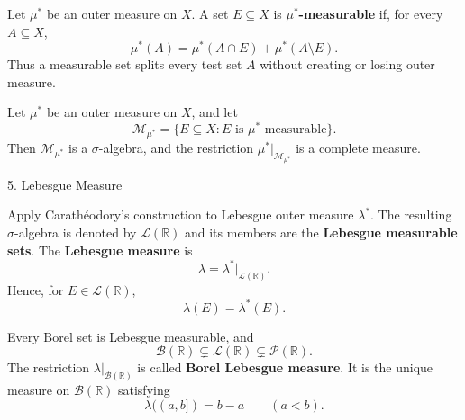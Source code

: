 \documentclass[12pt,a4paper]{article}
\begin{document}
\vspace{10pt}

\begin{definition}
    Let $\mu^*$ be an outer measure on $X$. A set $E\subseteq X$ is \textbf{$\mu^*$-measurable} if, for every $A\subseteq X$,
    \[
        \mu^*(A)=\mu^*(A\cap E)+\mu^*(A\setminus E).
    \]
    Thus a measurable set splits every test set $A$ without creating or losing outer measure.
\end{definition}

\clearpage

\begin{theorem}
    Let $\mu^*$ be an outer measure on $X$, and let
    \[
        \mathcal{M}_{\mu^*}
        =\{E\subseteq X:E\text{ is $\mu^*$-measurable}\}.
    \]
    Then $\mathcal{M}_{\mu^*}$ is a $\sigma$-algebra, and the restriction
    $\mu^*|_{\mathcal{M}_{\mu^*}}$ is a complete measure.
\end{theorem}

\clearpage

\begin{heading}
    5. Lebesgue Measure
\end{heading}

\vspace{10pt}

\begin{definition}
    Apply Carath\'eodory's construction to Lebesgue outer measure $\lambda^*$. The resulting $\sigma$-algebra is denoted by $\mathcal{L}(\mathbb{R})$ and its members are the \textbf{Lebesgue measurable sets}. The \textbf{Lebesgue measure} is
    \[
        \lambda=\lambda^*|_{\mathcal{L}(\mathbb{R})}.
    \]
    Hence, for $E\in\mathcal{L}(\mathbb{R})$,
    \[
        \lambda(E)=\lambda^*(E).
    \]
\end{definition}

\clearpage

\begin{theorem}
    Every Borel set is Lebesgue measurable, and
    \[
        \mathcal{B}(\mathbb{R})\subsetneq\mathcal{L}(\mathbb{R})
        \subsetneq\mathcal{P}(\mathbb{R}).
    \]
    The restriction $\lambda|_{\mathcal{B}(\mathbb{R})}$ is called \textbf{Borel Lebesgue measure}. It is the unique measure on $\mathcal{B}(\mathbb{R})$ satisfying
    \[
        \lambda((a,b])=b-a\qquad(a<b).
    \]
\end{theorem}
\end{document}
